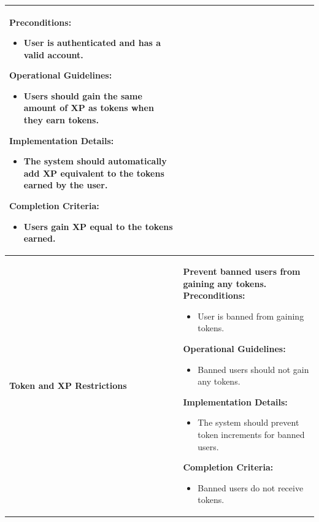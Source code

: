\begin{longtable}{ | p{} | p{} | }
    \textbf{Preconditions:} \newline
    \begin{itemize}
        \item User is authenticated and has a valid account.
    \end{itemize}
    \textbf{Operational Guidelines:} \newline
    \begin{itemize}
        \item Users should gain the same amount of XP as tokens when they earn tokens.
    \end{itemize}
    \textbf{Implementation Details:} \newline
    \begin{itemize}
        \item The system should automatically add XP equivalent to the tokens earned by the user.
    \end{itemize}
    \textbf{Completion Criteria:} \newline
    \begin{itemize}
        \item Users gain XP equal to the tokens earned.
    \end{itemize} \\
    \hline
    \textbf{Token and XP Restrictions} & \textbf{Prevent banned users from gaining any tokens.} \newline
    \textbf{Preconditions:} \newline
    \begin{itemize}
        \item User is banned from gaining tokens.
    \end{itemize}
    \textbf{Operational Guidelines:} \newline
    \begin{itemize}
        \item Banned users should not gain any tokens.
    \end{itemize}
    \textbf{Implementation Details:} \newline
    \begin{itemize}
        \item The system should prevent token increments for banned users.
    \end{itemize}
    \textbf{Completion Criteria:} \newline
    \begin{itemize}
        \item Banned users do not receive tokens.

\end{itemize}
\end{longtable}
